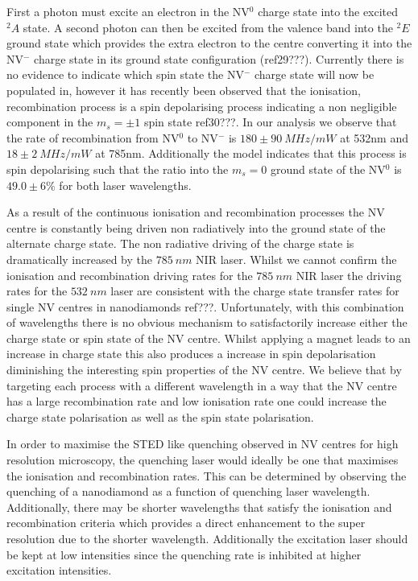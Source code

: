 \documentclass[prl]{revtex4}
\begin{document}
First a photon must excite an electron in the NV$^0$ charge state into the excited $^2A$ state. A second photon can then be excited from the valence band into the $^2E$ ground state which provides the extra electron to the centre converting it into the NV$^-$ charge state in its ground state configuration (ref29???). Currently there is no evidence to indicate which spin state the NV$^-$ charge state will now be populated in, however it has recently been observed that the ionisation, recombination process is a spin depolarising process indicating a non negligible component in the $m_s=\pm1$ spin state ref30???. In our analysis we observe that the rate of recombination from NV$^0$ to NV$^-$ is $180\pm\SI{90}{MHz/mW}$ at 532nm and $18\pm\SI{2}{MHz/mW}$ at 785nm. Additionally the model indicates that this process is spin depolarising such that the ratio into the $m_s=0$ ground state of the NV$^0$ is $49.0\pm6\%$ for both laser wavelengths. 

As a result of the continuous ionisation and recombination processes the NV centre is constantly being driven non radiatively into the ground state of the alternate charge state. The non radiative driving of the charge state is dramatically increased by the $\SI{785}{nm}$ NIR laser. Whilst we cannot confirm the ionisation and recombination driving rates for the $\SI{785}{nm}$ NIR laser the driving rates for the $\SI{532}{nm}$ laser are consistent with the charge state transfer rates for single NV centres in nanodiamonds ref???. Unfortunately, with this combination of wavelengths there is no obvious mechanism to satisfactorily increase either the charge state or spin state of the NV centre. Whilst applying a magnet leads to an increase in charge state this also produces a increase in spin depolarisation diminishing the interesting spin properties of the NV centre. We believe that by targeting each process with a different wavelength in a way that the NV centre has a large recombination rate and low ionisation rate one could increase the charge state polarisation as well as the spin state polarisation.

In order to maximise the STED like quenching observed in NV centres for high resolution microscopy, the quenching laser would ideally be one that maximises the ionisation and recombination rates. This can be determined by observing the quenching of a nanodiamond as a function of quenching laser wavelength. Additionally, there may be shorter wavelengths that satisfy the ionisation and recombination criteria which provides a direct enhancement to the super resolution due to the shorter wavelength. Additionally the excitation laser should be kept at low intensities since the quenching rate is inhibited at higher excitation intensities.
\end{document}
